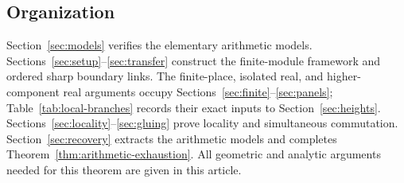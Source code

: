 \subsection{Organization}
Section~\ref{sec:models} verifies the elementary arithmetic models.
Sections~\ref{sec:setup}--\ref{sec:transfer} construct the finite-module
framework and ordered sharp boundary links. The finite-place, isolated
real, and higher-component real arguments occupy
Sections~\ref{sec:finite}--\ref{sec:panels}; Table~\ref{tab:local-branches}
records their exact inputs to Section~\ref{sec:heights}.
Sections~\ref{sec:locality}--\ref{sec:gluing} prove locality and
simultaneous commutation. Section~\ref{sec:recovery} extracts the
arithmetic models and completes Theorem~\ref{thm:arithmetic-exhaustion}.
All geometric and analytic arguments needed for this theorem are given
in this article.
